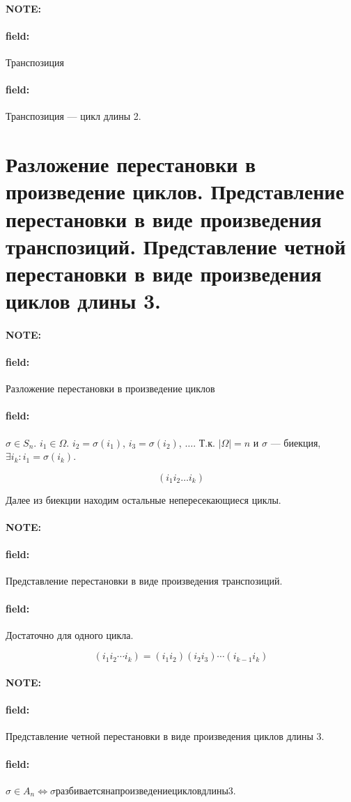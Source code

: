 \documentclass[12pt]{article}
\newenvironment{note}{\paragraph{NOTE:}}{}
\newenvironment{field}{\paragraph{field:}}{}
\begin{document}
\begin{note}
  \begin{field}
    Транспозиция
  \end{field}
  \begin{field}
    Транспозиция --- цикл длины 2.
  \end{field}
\end{note}

\section{Разложение перестановки в произведение циклов. Представление
перестановки в виде произведения транспозиций. Представление четной перестановки
в виде произведения циклов длины 3.}

\begin{note}
  \begin{field}
    Разложение перестановки в произведение циклов
  \end{field}
  \begin{field}
    $\sigma \in S_{n}$. $i_{1} \in \Omega$. $i_{2} = \sigma(i_{1})$, $i_{3} = \sigma(i_{2})$, $\ldots$. Т.к. $|\Omega| = n$ и $\sigma$ --- биекция, $\exists i_{k}: i_{1} = \sigma(i_{k})$.

    \begin{equation*}
      (i_{1}i_{2}\ldots{} i_{k})
    \end{equation*}

    Далее из биекции находим остальные непересекающиеся циклы.
  \end{field}
\end{note}

\begin{note}
  \begin{field}
    Представление перестановки в виде произведения транспозиций.
  \end{field}

  \begin{field}
    Достаточно для одного цикла.

    \begin{equation*}
      (i_{1} i_{2} \cdots i_{k}) =
      (i_{1} i_{2})(i_{2} i_{3}) \cdots
      (i_{k-1} i_{k})
    \end{equation*}
  \end{field}
\end{note}

\begin{note}
  \begin{field}
    Представление четной перестановки в виде произведения циклов длины 3.
  \end{field}
  \begin{field}
    $\sigma \in A_{n} \Leftrightarrow \sigma разбивается на произведение циклов длины 3$.
  \end{field}
\end{note}
\end{document}
